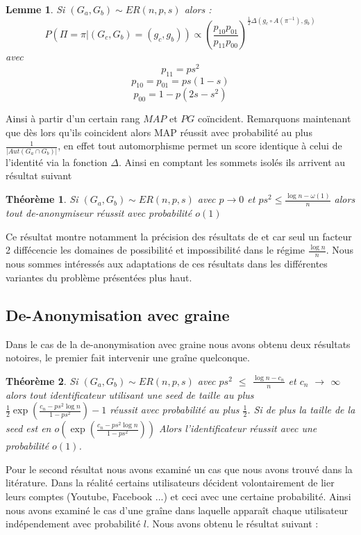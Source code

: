 \documentclass[letterpaper,10pt]{llncs}
\newtheorem{theoreme}{Théorème}
\newtheorem{lemme}{Lemme}
\begin{document}
\begin{lemme}
Si $(G_a,G_b) \sim ER(n,p,s)$ alors :
\[
P(\Pi = \pi|(G_c,G_b) = (g_c,g_b)) \propto (\frac{p_{10}p_{01}}{p_{11}p_{00}})^{\frac{1}{2} \Delta(g_c \circ A(\pi^{-1}), g_b)}
\]
avec
\[
p_{11} = ps^2 
\]
\[
p_{10} = p_{01} = ps(1-s)
\]
\[
p_{00} = 1 - p(2s-s^2)
\]
\end{lemme}
Ainsi à partir d'un certain rang $MAP$ et $PG$ coïncident.
Remarquons maintenant que dès lors qu'ils coincident alors MAP réussit avec probabilité au plus $\frac{1}{|Aut(G_a \cap G_b)|}$, en effet tout automorphisme permet un score identique à celui de l'identité via la fonction $\Delta$.
Ainsi en comptant les sommets isolés ils arrivent au résultat suivant 

\begin{theoreme}
Si $(G_a,G_b) \sim ER(n,p,s)$ avec $p \rightarrow 0$ et $ps^2 \leq \frac{\log n - \omega(1)}{n}$ alors tout de-anonymiseur réussit avec probabilité $o(1)$
\end{theoreme}

Ce résultat montre notamment la précision des résultats de \cite{Pedarsani:2011:PAN:2020408.2020596} et \cite{Cullina:2016:IAC:2964791.2901460} car seul un facteur 2 diffécencie les domaines de possibilité et impossibilité dans le régime $\frac{\log n}{n}$. Nous nous sommes intéressés aux adaptations de ces résultats dans les différentes variantes du problème présentées plus haut.

\subsection{De-Anonymisation avec graine}

Dans le cas de la de-anonymisation avec graine nous avons obtenu deux résultats notoires, le premier fait intervenir une graîne quelconque. 

\begin{theoreme}
Si $(G_a,G_b) \sim ER(n,p,s)$ avec $ps^{2}$ $\leq$ $\frac{\log n - c_n}{n}$ et $c_n$ $\rightarrow$ $\infty$ alors tout identificateur utilisant une seed de taille au plus $\frac{1}{2} \exp(\frac{c_n - ps^{2} \log n}{1-ps^{2}}) - 1$ réussit avec probabilité au plus $\frac{1}{2}$. Si de plus la taille de la seed est en $o( \exp(\frac{c_n - ps^{2} \log n}{1-ps^{2}}))$ Alors l'identificateur réussit avec une probabilité $o(1)$.
\end{theoreme}

Pour le second résultat nous avons examiné un cas que nous avons trouvé dans la litérature. Dans la réalité certains utilisateurs décident volontairement de lier leurs comptes (Youtube, Facebook ...) et ceci avec une certaine probabilité. Ainsi nous avons examiné le cas d'une graîne dans laquelle apparaît chaque utilisateur indépendement avec probabilité $l$. Nous avons obtenu le résultat suivant :
\end{document}
